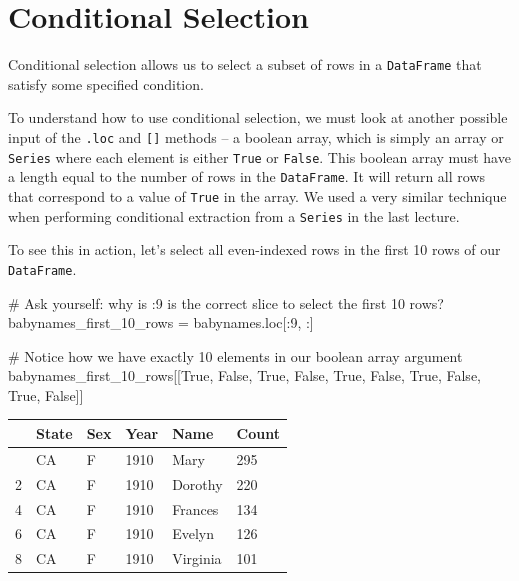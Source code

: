 \documentclass[
  letterpaper,
  DIV=11,
  numbers=noendperiod]{scrreprt}
\newenvironment{Shaded}{\begin{snugshade}}{\end{snugshade}}
\newcommand{\CommentTok}[1]{\textcolor[rgb]{0.37,0.37,0.37}{#1}}
\newcommand{\DecValTok}[1]{\textcolor[rgb]{0.68,0.00,0.00}{#1}}
\newcommand{\NormalTok}[1]{\textcolor[rgb]{0.00,0.23,0.31}{#1}}
\newcommand{\OperatorTok}[1]{\textcolor[rgb]{0.37,0.37,0.37}{#1}}
\newcommand{\VariableTok}[1]{\textcolor[rgb]{0.07,0.07,0.07}{#1}}
\begin{document}
\section{Conditional Selection}\label{conditional-selection}

Conditional selection allows us to select a subset of rows in a
\texttt{DataFrame} that satisfy some specified condition.

To understand how to use conditional selection, we must look at another
possible input of the \texttt{.loc} and \texttt{{[}{]}} methods -- a
boolean array, which is simply an array or \texttt{Series} where each
element is either \texttt{True} or \texttt{False}. This boolean array
must have a length equal to the number of rows in the
\texttt{DataFrame}. It will return all rows that correspond to a value
of \texttt{True} in the array. We used a very similar technique when
performing conditional extraction from a \texttt{Series} in the last
lecture.

To see this in action, let's select all even-indexed rows in the first
10 rows of our \texttt{DataFrame}.

\begin{Shaded}
\begin{Highlighting}[]
\CommentTok{\# Ask yourself: why is :9 is the correct slice to select the first 10 rows?}
\NormalTok{babynames\_first\_10\_rows }\OperatorTok{=}\NormalTok{ babynames.loc[:}\DecValTok{9}\NormalTok{, :]}

\CommentTok{\# Notice how we have exactly 10 elements in our boolean array argument}
\NormalTok{babynames\_first\_10\_rows[[}\VariableTok{True}\NormalTok{, }\VariableTok{False}\NormalTok{, }\VariableTok{True}\NormalTok{, }\VariableTok{False}\NormalTok{, }\VariableTok{True}\NormalTok{, }\VariableTok{False}\NormalTok{, }\VariableTok{True}\NormalTok{, }\VariableTok{False}\NormalTok{, }\VariableTok{True}\NormalTok{, }\VariableTok{False}\NormalTok{]]}
\end{Highlighting}
\end{Shaded}

\begin{longtable}[]{@{}llllll@{}}
\toprule\noalign{}
& State & Sex & Year & Name & Count \\
\midrule\noalign{}
\endhead
\bottomrule\noalign{}
\endlastfoot
0 & CA & F & 1910 & Mary & 295 \\
2 & CA & F & 1910 & Dorothy & 220 \\
4 & CA & F & 1910 & Frances & 134 \\
6 & CA & F & 1910 & Evelyn & 126 \\
8 & CA & F & 1910 & Virginia & 101 \\
\end{longtable}
\end{document}
